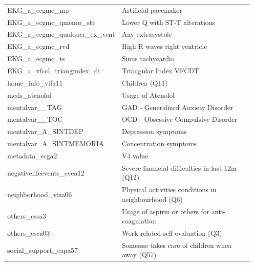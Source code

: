 \begin{table}[H]
\begin{center}
\begin{tabular}{l|l}
            EKG\_a\_ecgmc\_mp                 & Artificial pacemaker                                  \\
            EKG\_a\_ecgmc\_qmenor\_stt        & Lower Q with ST-T alterations                         \\
            EKG\_a\_ecgmc\_qualquer\_ex\_vent & Any extrasystole                                      \\
            EKG\_a\_ecgmc\_rvd                & High R waves right ventricle                          \\
            EKG\_a\_ecgmc\_ts                 & Sinus tachycardia                                     \\
            EKG\_a\_vfccl\_triangindex\_dt    & Triangular Index VFCDT                                \\
            home\_info\_vifa11                & Children (Q11)                                        \\
            meds\_atenolol                    & Usage of Atenolol                                     \\
            mentalvar\_\_TAG                  & GAD - Generalized Anxiety Disorder                    \\
            mentalvar\_\_TOC                  & OCD - Obsessive Compulsive Disorder                   \\
            mentalvar\_A\_SINTDEP             & Depression symptoms                                   \\
            mentalvar\_A\_SINTMEMORIA         & Concentration symptoms                                \\
            metadata\_ecga2                   & V4 value                                              \\
            negativelifeevents\_evea12        & Severe financial difficulties in last 12m (Q12)       \\
            neighborhood\_viza06              & Physical activities conditions in neighbourhood (Q6)  \\
            others\_cssa3                     & Usage of aspirin or others for anti-coagulation       \\
            others\_esca03                    & Work-related self-evaluation (Q3)                     \\
            social\_support\_capa57           & Someone takes care of children when away (Q57)        \\
            \hline
        \end{tabular}
    \end{center}
    \label{tab:most-important-variables}
\end{table}

